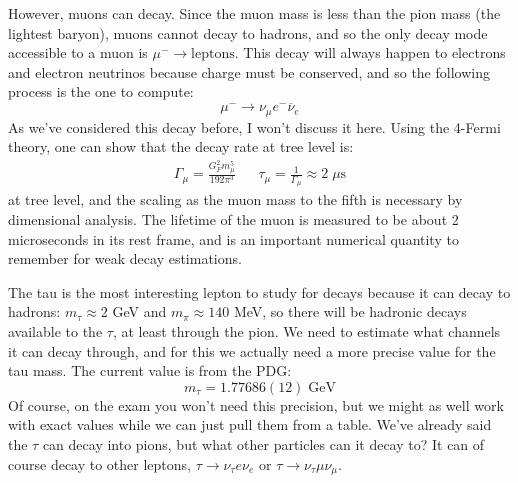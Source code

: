 \documentclass[11pt, oneside]{article}   	%
\theoremstyle{definition}
\numberwithin{equation}{subsection}		%
\begin{document}
However, muons can decay. Since the muon mass is less than the pion mass (the lightest baryon), muons cannot decay to hadrons, and 
so the only decay mode accessible to a muon is $\mu^-\rightarrow\mathrm{leptons}$. This decay will always happen to electrons and 
electron neutrinos because charge must be conserved, and so the following process is the one to compute:
\begin{equation}
	\mu^-\rightarrow\nu_\mu e^-\overline\nu_e
\end{equation}
As we've considered this decay before, I won't discuss it here. Using the 4-Fermi theory, one can show that the decay rate at tree level 
is:
\begin{align}
	\Gamma_\mu = \frac{G_F^2 m_\mu^5}{192\pi^3} && \tau_\mu = \frac{1}{\Gamma_\mu} \approx 2\;\mu\mathrm{s}
	\label{eq:muon_lifetime}
\end{align}
at tree level, and the scaling as the muon mass to the fifth is necessary by dimensional analysis. The lifetime of the muon is measured to 
be about 2 microseconds in its rest frame, and is an important numerical quantity to remember for weak decay estimations.

The tau is the most interesting lepton to study for decays because it can decay to hadrons: $m_\tau \approx 2$ GeV and $m_\pi\approx 
140$ MeV, so there will be hadronic decays available to the $\tau$, at least through the pion. We need to estimate what channels it can 
decay through, and for this we actually need a more precise value for the tau mass. The current value is from the PDG:
\begin{equation}
	m_\tau = 1.77686(12)\;\mathrm{GeV}
\end{equation}
Of course, on the exam you won't need this precision, but we might as well work with exact values while we can just pull them from a table. We've already said the 
$\tau$ can decay into pions, but what other particles can it decay to? It can of course decay to other leptons, $\tau\rightarrow \nu_\tau e \nu_e$ or $\tau\rightarrow\nu_\tau 
\mu\nu_\mu$. 
\end{document}
